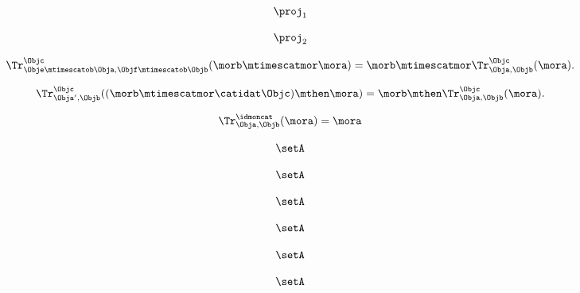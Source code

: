 {\begin{forslides}
        \begin{equation}
            \label{eq:feedback-154}
            \proj_1
        \end{equation}

        \begin{equation}
            \label{eq:feedback-155}
            \proj_2
        \end{equation}

        \begin{equation}
            \label{eq:feedback-160}
            \Tr_{\Obje\mtimescatob \Obja,\Objf\mtimescatob \Objb}^{\Objc}(\morb \mtimescatmor \mora)=\morb \mtimescatmor \Tr_{\Obja,\Objb}^\Objc(\mora).
        \end{equation}

        \begin{equation}
            \label{eq:feedback-161}
            \Tr_{\Obja', \Objb}^\Objc ( (\morb \mtimescatmor \catidat\Objc) \mthen \mora) = \morb \mthen \Tr_{\Obja, \Objb}^\Objc (\mora).
        \end{equation}

        \begin{equation}
            \label{eq:feedback-162}
            \Tr_{\Obja,\Objb}^\idmoncat (\mora)=\mora
        \end{equation}

        \begin{equation}
            \label{eq:feedback-163}
            \setA
        \end{equation}

        \begin{equation}
            \label{eq:feedback-164}
            \setA
        \end{equation}

        \begin{equation}
            \label{eq:feedback-165}
            \setA
        \end{equation}

        \begin{equation}
            \label{eq:feedback-166}
            \setA
        \end{equation}

        \begin{equation}
            \label{eq:feedback-167}
            \setA
        \end{equation}

        \begin{equation}
            \label{eq:feedback-168}
            \setA
        \end{equation}


\end{forslides}}
